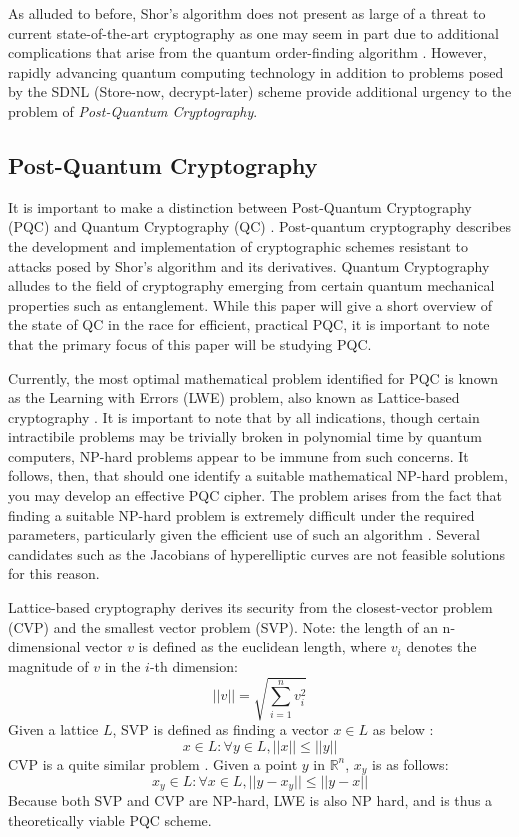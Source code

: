 \documentclass[12pt]{article}
\begin{document}
As alluded to before, Shor's algorithm does not present as large of a threat to current state-of-the-art cryptography as one may seem in part due to additional complications that arise from the quantum order-finding algorithm \autocite{roetteler_quantum_2017}. 
However, rapidly advancing quantum computing technology in addition to problems posed by the SDNL (Store-now, decrypt-later) scheme provide additional urgency to the problem of \emph{Post-Quantum Cryptography}.

\subsection{Post-Quantum Cryptography}
It is important to make a distinction between Post-Quantum Cryptography (PQC) \autocite{blanco-chacon_ring_2019} and Quantum Cryptography (QC) \autocite{pirandola_advances_2020}. 
Post-quantum cryptography describes the development and implementation of cryptographic schemes resistant to attacks posed by Shor's algorithm and its derivatives. 
Quantum Cryptography alludes to the field of cryptography emerging from certain quantum mechanical properties such as entanglement. 
While this paper will give a short overview of the state of QC in the race for efficient, practical PQC, it is important to note that the primary focus of this paper will be studying PQC. 

Currently, the most optimal mathematical problem identified for PQC is known as the Learning with Errors (LWE) problem, also known as Lattice-based cryptography \autocite{blanco-chacon_ring_2019}. 
It is important to note that by all indications, though certain intractibile problems may be trivially broken in polynomial time by quantum computers, NP-hard problems appear to be immune from such concerns. 
It follows, then, that should one identify a suitable mathematical NP-hard problem, you may develop an effective PQC cipher. 
The problem arises from the fact that finding a suitable NP-hard problem is extremely difficult under the required parameters, particularly given the efficient use of such an algorithm \autocite{blanco-chacon_ring_2019}.
Several candidates such as the Jacobians of hyperelliptic curves are not feasible solutions for this reason. 

Lattice-based cryptography derives its security from the closest-vector problem (CVP) and the smallest vector problem (SVP). 
Note: the length of an n-dimensional vector $v$ is defined as the euclidean length, where $v_i$ denotes the magnitude of $v$ in the $i$-th dimension: 
$$ ||v|| = \sqrt{\sum_{i=1}^{n}v^2_i} $$
Given a lattice $L$, SVP is defined as finding a vector $x \in L$ as below \autocite{blanco-chacon_ring_2019}: 
$$ x \in L : \forall y \in L, || x || \leq || y || $$
CVP is a quite similar problem \autocite{blanco-chacon_ring_2019}. Given a point $y$ in $\mathbb{R}^n$, $x_y$ is as follows: 
$$ x_y \in L : \forall x \in L, || y - x_y || \leq || y - x || $$
Because both SVP and CVP are NP-hard, LWE is also NP hard, and is thus a theoretically viable PQC scheme. \autocite{vaikuntanathan_advanced_2015}
\end{document}
